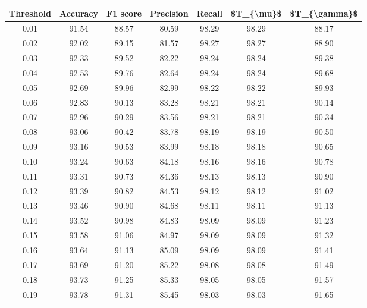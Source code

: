 \begin{tabular}{|c|c|c|c|c|c|c|}
\hline
 Threshold &  Accuracy &  F1 score &  Precision &  Recall &  \$T\_\{\textbackslash mu\}\$ &  \$T\_\{\textbackslash gamma\}\$ \\
\hline
      0.01 &     91.54 &     88.57 &      80.59 &   98.29 &      98.29 &         88.17 \\
      0.02 &     92.02 &     89.15 &      81.57 &   98.27 &      98.27 &         88.90 \\
      0.03 &     92.33 &     89.52 &      82.22 &   98.24 &      98.24 &         89.38 \\
      0.04 &     92.53 &     89.76 &      82.64 &   98.24 &      98.24 &         89.68 \\
      0.05 &     92.69 &     89.96 &      82.99 &   98.22 &      98.22 &         89.93 \\
      0.06 &     92.83 &     90.13 &      83.28 &   98.21 &      98.21 &         90.14 \\
      0.07 &     92.96 &     90.29 &      83.56 &   98.21 &      98.21 &         90.34 \\
      0.08 &     93.06 &     90.42 &      83.78 &   98.19 &      98.19 &         90.50 \\
      0.09 &     93.16 &     90.53 &      83.99 &   98.18 &      98.18 &         90.65 \\
      0.10 &     93.24 &     90.63 &      84.18 &   98.16 &      98.16 &         90.78 \\
      0.11 &     93.31 &     90.73 &      84.36 &   98.13 &      98.13 &         90.90 \\
      0.12 &     93.39 &     90.82 &      84.53 &   98.12 &      98.12 &         91.02 \\
      0.13 &     93.46 &     90.90 &      84.68 &   98.11 &      98.11 &         91.13 \\
      0.14 &     93.52 &     90.98 &      84.83 &   98.09 &      98.09 &         91.23 \\
      0.15 &     93.58 &     91.06 &      84.97 &   98.09 &      98.09 &         91.32 \\
      0.16 &     93.64 &     91.13 &      85.09 &   98.09 &      98.09 &         91.41 \\
      0.17 &     93.69 &     91.20 &      85.22 &   98.08 &      98.08 &         91.49 \\
      0.18 &     93.73 &     91.25 &      85.33 &   98.05 &      98.05 &         91.57 \\
      0.19 &     93.78 &     91.31 &      85.45 &   98.03 &      98.03 &         91.65 \\

\end{tabular}
